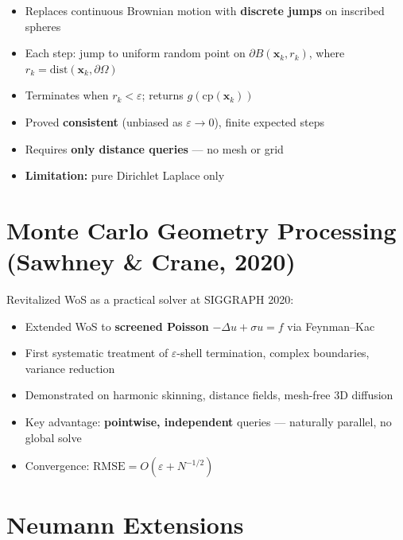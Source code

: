 \documentclass[11pt]{article}
\begin{document}
\begin{itemize}
  \item Replaces continuous Brownian motion with \textbf{discrete jumps} on inscribed spheres
  \item Each step: jump to uniform random point on $\partial B(\mathbf{x}_k, r_k)$, where $r_k = \mathrm{dist}(\mathbf{x}_k, \partial\Omega)$
  \item Terminates when $r_k < \varepsilon$; returns $g(\mathrm{cp}(\mathbf{x}_k))$
  \item Proved \textbf{consistent} (unbiased as $\varepsilon \to 0$), finite expected steps
  \item Requires \textbf{only distance queries} --- no mesh or grid
  \item \textbf{Limitation:} pure Dirichlet Laplace only
\end{itemize}

\section{Monte Carlo Geometry Processing (Sawhney \& Crane, 2020)}

Revitalized WoS as a practical solver at SIGGRAPH 2020:

\begin{itemize}
  \item Extended WoS to \textbf{screened Poisson} $-\Delta u + \sigma u = f$ via Feynman--Kac
  \item First systematic treatment of $\varepsilon$-shell termination, complex boundaries, variance reduction
  \item Demonstrated on harmonic skinning, distance fields, mesh-free 3D diffusion
  \item Key advantage: \textbf{pointwise, independent} queries --- naturally parallel, no global solve
  \item Convergence: $\mathrm{RMSE} = O(\varepsilon + N^{-1/2})$
\end{itemize}

\section{Neumann Extensions}
\end{document}
